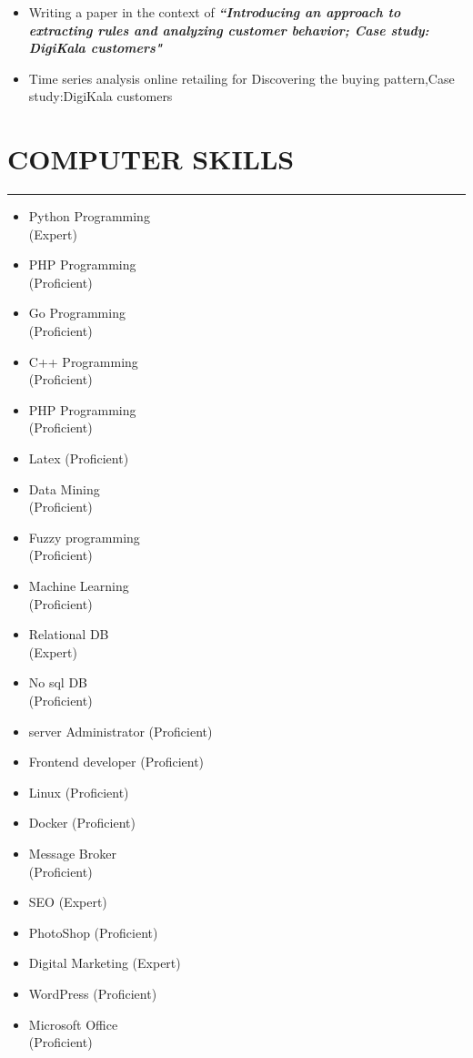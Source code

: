 \documentclass[12pt]{res} %
\begin{document}
\begin{resume}
\begin{itemize}
\item Writing a paper in the context of  \textbf {\textit {“Introducing an approach to extracting rules and analyzing customer behavior; Case study: DigiKala customers"}} 
\item Time series analysis online retailing for Discovering the buying pattern,Case study:DigiKala customers
\end{itemize}
\section{\bf COMPUTER SKILLS}
\vspace{-8pt}
\noindent\rule{\textwidth}{0.5mm}
\begin{multicols}{3}
\begin{itemize}\itemsep 8pt
\item Python Programming \\
(Expert)
\item PHP Programming\\(Proficient)
\item Go Programming\\(Proficient)
\item C++ Programming\\(Proficient)
\item PHP Programming\\(Proficient)
\item Latex (Proficient)
\end{itemize}
\columnbreak
\begin{itemize}\itemsep 8pt
\item Data Mining\\ (Proficient)
\item Fuzzy programming\\ (Proficient)
\item Machine Learning\\ (Proficient)
\item Relational DB\\ (Expert)
\item No sql DB\\ (Proficient)
\item server Administrator (Proficient)
\item Frontend developer (Proficient)
\end{itemize}
\columnbreak
\begin{itemize}\itemsep 8pt
\item Linux (Proficient)
\item Docker (Proficient)
\item Message Broker \\(Proficient)
\item SEO (Expert)
\item PhotoShop (Proficient)
\item Digital Marketing \hspace{8pt}(Expert)
\item WordPress (Proficient)
\item  Microsoft Office \\
(Proficient)
\end{itemize}
\end{multicols}

\end{resume}
\end{document}
